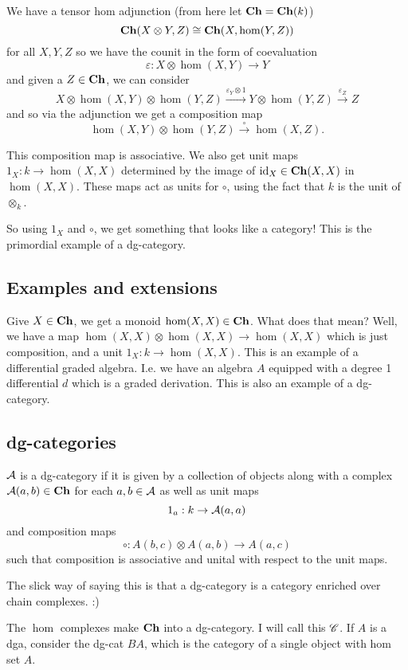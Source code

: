 \documentclass[12pt]{article}
\begin{document}
\brk

We have a tensor hom adjunction (from here let $\operatorname{\mathbf{Ch}}=\operatorname{\mathbf{Ch}}(k)$)
\[\operatorname{\mathbf{Ch}}(X\otimes Y,Z)\cong \operatorname{\mathbf{Ch}}(X,\operatorname{hom}(Y,Z))\]
for all $X,Y,Z$ so we have the counit in the form of coevaluation
\[\varepsilon:X\otimes\hom(X,Y)\to Y\]
and given a $Z\in\operatorname{\mathbf{Ch}}$, we can consider 
\[X\otimes\hom(X,Y)\otimes\hom(Y,Z)\xrightarrow{\varepsilon_Y\otimes 1}Y\otimes \hom(Y,Z)\xrightarrow{\varepsilon_Z} Z\]
and so via the adjunction we get a composition map 
\[\hom(X,Y)\otimes\hom(Y,Z)\xrightarrow{\circ}\hom(X,Z).\]

This composition map is associative. We also get unit maps $1_X:k\to\hom(X,X)$ determined by the image of $\operatorname{id}_X\in\operatorname{\mathbf{Ch}}(X,X)$ in $\hom(X,X)$.
These maps act as units for $\circ$, using the fact that $k$ is the unit of $\otimes_k$.

So using $1_X$ and $\circ$, we get something that looks like a category! This is the primordial example of a dg-category.

\subsection{Examples and extensions}
Give $X\in\operatorname{\mathbf{Ch}}$, we get a monoid $\operatorname{hom}(X,X)\in\operatorname{\mathbf{Ch}}$. What does that mean? Well, we have a map $\hom(X,X)\otimes\hom(X,X)\to\hom(X,X)$
which is just composition, and a unit $1_X:k\to\hom(X,X)$. This is an example of a differential graded algebra. I.e. we have an algebra $A$ equipped with 
a degree 1 differential $d$ which is a graded derivation.
This is also an example of a dg-category.

\subsection{dg-categories}
\begin{defn}
	$\mathcal{A}$ is a dg-category if it is given by a collection of objects along with a complex 
	$\mathcal{A}(a,b)\in\operatorname{\mathbf{Ch}}$ for each $a,b\in\mathcal{A}$ as well as unit maps 
	\[1_a:k\to\mathcal{A}(a,a)\]
	and composition maps 
	\[\circ:A(b,c)\otimes A(a,b)\to A(a,c)\]
	such that composition is associative and unital with respect to the unit maps.
\end{defn}
\begin{rmk}
	The slick way of saying this is that a dg-category is a category enriched over chain complexes. :)
\end{rmk}

The $\hom$ complexes make $\operatorname{\mathbf{Ch}}$ into a dg-category. I will call this $\mathscr{C}$. If $A$ is a dga, consider the dg-cat $BA$, 
which is the category of a single object with hom set $A$.
\end{document}
